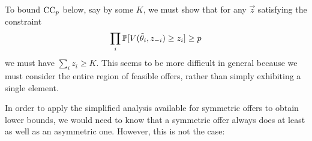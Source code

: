 To bound $\mathrm{CC}_{p}$ below, say by some $K$, we must show that for any $\vec{z}$ satisfying the constraint
%
\[
  \prod_i\mathbb{P}[V (\tilde{\theta}_i,z_{-i}) \geq z_i] \geq p 
\]
%
we must have $\sum_iz_i \geq K$.
%
This seems to be more difficult in general because we must consider the entire region of feasible offers, rather than simply exhibiting a single element.


In order to apply the simplified analysis available for symmetric offers to obtain lower bounds, we would need to know that a symmetric offer always does at least as well as an asymmetric one.
%
However, this is not the case:





\begin{comment}
Some examples:
%
\begin{itemize}
  \item Network layer censorship --- eclipse attack, spam.
  \item Consensus level Byzantine equivocation, failure to attest. Thresholds here are guaranteed by results in BFT consensus theory and apply to the full consensus value, i.e.~full blocks in Ethereum.
  \item System state manipulation (e.g. governance attack, randomness manipulation). This includes what \cite{wahrstatter2024blockchain} calls \emph{application layer} censorship.
  \item Blockspace congestion.
\end{itemize}
%

\begin{example}[Liveness failures without censorship]

  In some cases, it may be incentive compatible to omit transactions without the intervention of an adversary with preferences over exclusion.
  For example, if the fee attached to a transaction is less than the marginal orphan risk increase associated to its inclusion, it should be individually rational to omit it; the costs associated with the previous calculation therefore vanish.
  If these types of situations fall within our definition of censorship, then we are forced to accept that the associated `censorship resistance' values are zero (or negative).\footnote{Such cases do fall into scope for some objectives quoted for Ethereum, such as `chain neutrality' \url{https://ethresear.ch/t/uncrowdable-inclusion-lists-the-tension-between-chain-neutrality-preconfirmations-and-proposer-commitments/19372/6}.}


\end{comment}
